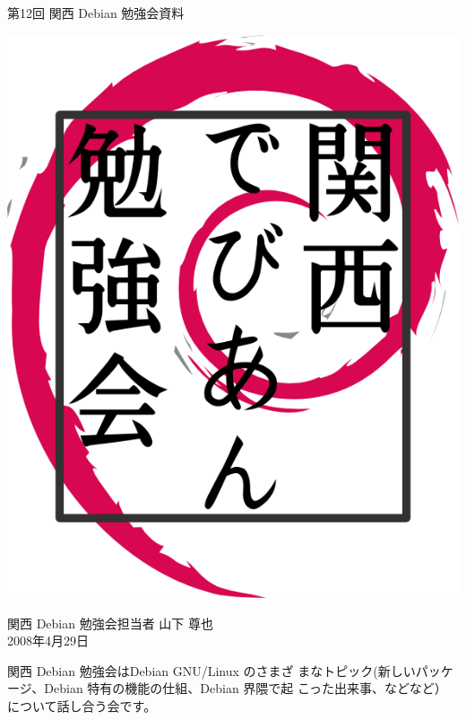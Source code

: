 \documentclass[mingoth,a4paper]{jsarticle}
\newcommand{\debmtgyear}{2008}
\newcommand{\debmtgdate}{29}
\newcommand{\debmtgmonth}{4}
\newcommand{\debmtgnumber}{12}
\begin{document}
\begin{titlepage}


 第\debmtgnumber{}回 関西 Debian 勉強会資料

\vspace{2cm}

\begin{center}
\includegraphics{image200802/kansaidebianlogo.png}
\end{center}

\begin{flushright}
\hfill{}関西 Debian 勉強会担当者 山下 尊也\\
\hfill{}\debmtgyear{}年\debmtgmonth{}月\debmtgdate{}日
\end{flushright}

\thispagestyle{empty}
\end{titlepage}

 
 関西 Debian 勉強会はDebian GNU/Linux のさまざ
 まなトピック(新しいパッケージ、Debian 特有の機能の仕組、Debian 界隈で起
 こった出来事、などなど）について話し合う会です。
\end{document}
